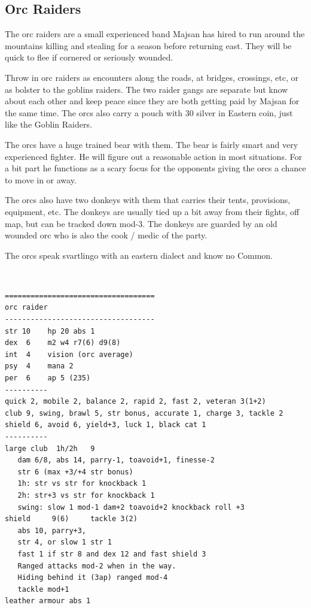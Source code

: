 










\goodbreak
{}
\subsection*{Orc Raiders}
The orc raiders are a small experienced band Majsan has hired to run around the mountains killing and stealing for a season before returning east. They will be quick to flee if cornered or seriously wounded.

Throw in orc raiders as encounters along the roads, at bridges, crossings, etc, or as bolster to the goblins raiders. The two raider gangs are separate but know about each other and keep peace since they are both getting paid by Majsan for the same time. The orcs also carry a pouch with 30 silver in Eastern coin, just like the Goblin Raiders.

The orcs have a huge trained bear with them. The bear is fairly smart and very experienced fighter. He will figure out a reasonable action in most situations. For a bit part he functions as a scary focus for the opponents giving the orcs a chance to move in or away.

The orcs also have two donkeys with them that carries their tents, provisions, equipment, etc. The donkeys are usually tied up a bit away from their fights, off map, but can be tracked down mod-3. The donkeys are guarded by an old wounded orc who is also the cook / medic of the party.

The orcs speak svartlingo with an eastern dialect and know no Common.

\

\begin{samepage} \small \begin{verbatim}
===================================
orc raider
-----------------------------------
str 10    hp 20 abs 1
dex  6    m2 w4 r7(6) d9(8)
int  4    vision (orc average)
psy  4    mana 2
per  6    ap 5 (235)
----------
quick 2, mobile 2, balance 2, rapid 2, fast 2, veteran 3(1+2)
club 9, swing, brawl 5, str bonus, accurate 1, charge 3, tackle 2
shield 6, avoid 6, yield+3, luck 1, black cat 1
----------
large club  1h/2h   9
   dam 6/8, abs 14, parry-1, toavoid+1, finesse-2
   str 6 (max +3/+4 str bonus)
   1h: str vs str for knockback 1
   2h: str+3 vs str for knockback 1
   swing: slow 1 mod-1 dam+2 toavoid+2 knockback roll +3
shield     9(6)     tackle 3(2)
   abs 10, parry+3,
   str 4, or slow 1 str 1
   fast 1 if str 8 and dex 12 and fast shield 3
   Ranged attacks mod-2 when in the way.
   Hiding behind it (3ap) ranged mod-4
   tackle mod+1
leather armour abs 1
\end{verbatim} \normalsize \end{samepage}

